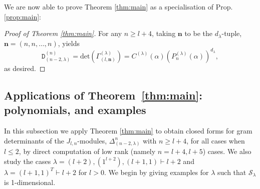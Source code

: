 \documentclass{article}
\newcommand{\ppm}[1]{\textcolor{red}{#1}}
\newcommand{\ppmm}[1]{#1}  %
\newcommand{\bajm}[1]{\textcolor{blue}{#1}}
\theoremstyle{definition}
\newcommand{\Delt}[2]{\Delta^{#1}_{(#2)}}  %
\newcommand{\Deltt}{{\mathtt D}}   %
\newcommand{\Delttt}[2]{\Deltt^{#1}_{(#2)}}  %
\def\SS{\mathcal{S}} %
\def\a{\alpha}
\def\l{\lambda}
\numberwithin{equation}{subsection}
\begin{document}
We are now able to prove Theorem \ref{thm:main} as a specialisation of Prop. \ref{prop:main}:

\begin{proof}[Proof of Theorem \ref{thm:main}] For any $n\geq l+4$, taking $\bm{n}$ to be the $d_{\l}$-tuple, $\bm{n}=(n,n,\dots, n)$, yields
\[\Delttt{(n)}{n-2,\l}=\text{det}(\Gamma_{(l,\bm{n})}^{(\l)})=C^{(\l)}(\a) (P^{(\l)}_{n}(\a))^{d_{\l}},\]
as desired. \end{proof}


\subsection{Applications of Theorem~\ref{thm:main}: \ppmm{polynomials,} and examples}   \label{ss:examples0}

In this subsection we apply Theorem \ref{thm:main} to obtain closed forms for gram determinants of the $J_{l,n}$-modules, $\Delt{n}{n-2,\l}$ with $n\geq l+4$, for all cases when $l\leq 2$, by direct computation of low rank (namely $n=l+4,l+5$) cases. 
We also study the cases $\l=(l+2), (1^{l+2}), (l+1,1)\vdash l+2$ and $\l=(l+1,1)^T\vdash l+2$ for $l>0$. We begin by giving examples for $\l$ such that $\SS_\l$ is 1-dimensional.
\end{document}
